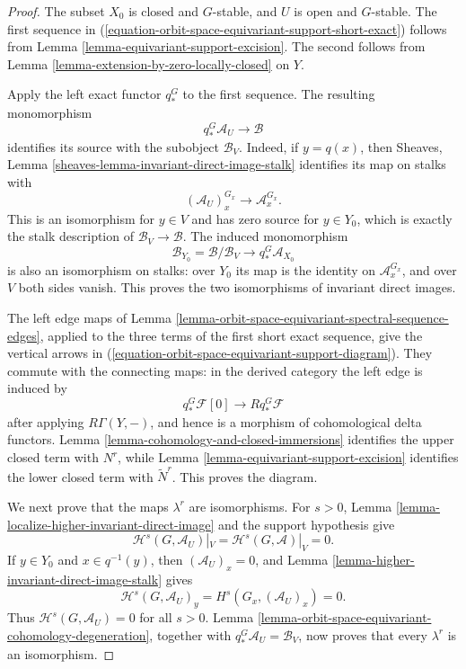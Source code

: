 \begin{proof}
The subset $X_0$ is closed and $G$-stable, and $U$ is open and $G$-stable.
The first sequence in
(\ref{equation-orbit-space-equivariant-support-short-exact}) follows from
Lemma \ref{lemma-equivariant-support-excision}. The second follows from
Lemma \ref{lemma-extension-by-zero-locally-closed} on $Y$.

Apply the left exact functor $q_*^G$ to the first sequence. The resulting
monomorphism
$$
q_*^G\mathcal{A}_U\longrightarrow\mathcal{B}
$$
identifies its source with the subobject $\mathcal{B}_V$. Indeed, if
$y=q(x)$, then Sheaves, Lemma
\ref{sheaves-lemma-invariant-direct-image-stalk} identifies its map on
stalks with
$$
(\mathcal{A}_U)_x^{G_x}\longrightarrow\mathcal{A}_x^{G_x}.
$$
This is an isomorphism for $y\in V$ and has zero source for $y\in Y_0$,
which is exactly the stalk description of
$\mathcal{B}_V\to\mathcal{B}$. The induced monomorphism
$$
\mathcal{B}_{Y_0}=\mathcal{B}/\mathcal{B}_V
\longrightarrow q_*^G\mathcal{A}_{X_0}
$$
is also an isomorphism on stalks: over $Y_0$ its map is the identity on
$\mathcal{A}_x^{G_x}$, and over $V$ both sides vanish. This proves the two
isomorphisms of invariant direct images.

The left edge maps of Lemma
\ref{lemma-orbit-space-equivariant-spectral-sequence-edges}, applied to the
three terms of the first short exact sequence, give the vertical arrows in
(\ref{equation-orbit-space-equivariant-support-diagram}). They commute with
the connecting maps: in the derived category the left edge is induced by
$$
q_*^G\mathcal{F}[0]\longrightarrow Rq_*^G\mathcal{F}
$$
after applying $R\Gamma(Y,-)$, and hence is a morphism of cohomological
delta functors. Lemma \ref{lemma-cohomology-and-closed-immersions}
identifies the upper closed term with $N^r$, while Lemma
\ref{lemma-equivariant-support-excision} identifies the lower closed term
with $\widetilde N^r$. This proves the diagram.

We next prove that the maps $\lambda^r$ are isomorphisms. For $s>0$,
Lemma \ref{lemma-localize-higher-invariant-direct-image} and the support
hypothesis give
$$
\mathcal{H}^s(G,\mathcal{A}_U)|_V
=\mathcal{H}^s(G,\mathcal{A})|_V=0.
$$
If $y\in Y_0$ and $x\in q^{-1}(y)$, then
$(\mathcal{A}_U)_x=0$, and Lemma
\ref{lemma-higher-invariant-direct-image-stalk} gives
$$
\mathcal{H}^s(G,\mathcal{A}_U)_y
=H^s(G_x,(\mathcal{A}_U)_x)=0.
$$
Thus $\mathcal{H}^s(G,\mathcal{A}_U)=0$ for all $s>0$. Lemma
\ref{lemma-orbit-space-equivariant-cohomology-degeneration}, together with
$q_*^G\mathcal{A}_U=\mathcal{B}_V$, now proves that every $\lambda^r$ is an
isomorphism.


\end{proof}
